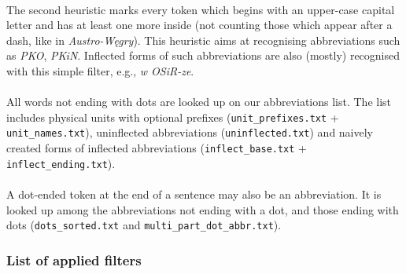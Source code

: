 \documentclass[oneside,12pt]{article}
\begin{document}
\paragraph{}
The second heuristic marks every token which begins with an upper-case capital letter and has at least one more inside (not counting those which appear after a dash, like in \textit{Austro-Węgry}). This heuristic aims at recognising abbreviations such as \textit{PKO}, \textit{PKiN}. Inflected forms of such abbreviations are also (mostly) recognised with this simple filter, e.g., \textit{w OSiR-ze}.

\paragraph{}
All words not ending with dots are looked up on our abbreviations list. The list includes physical units with optional prefixes (\texttt{unit\_prefixes.txt} + \texttt{unit\_names.txt}), uninflected abbreviations (\texttt{uninflected.txt}) and naively created forms of inflected abbreviations (\texttt{inflect\_base.txt} + \texttt{inflect\_ending.txt}).

\paragraph{}
A dot-ended token at the end of a sentence may also be an abbreviation. It is looked up among the abbreviations not ending with a dot, and those ending with dots (\texttt{dots\_sorted.txt} and \texttt{multi\_part\_dot\_abbr.txt}).

\subsubsection{List of applied filters}
\end{document}
